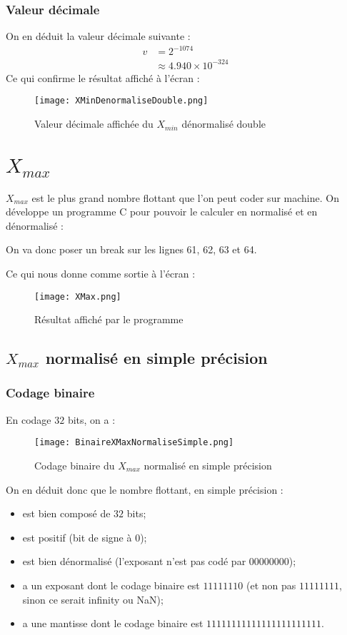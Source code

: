 \documentclass[a4paper, titlepage]{livret} %
\begin{document}
				\subsubsection{Valeur décimale}
					On en déduit la valeur décimale suivante :
					\[\begin{aligned}
						v & = 2^{-1074}\\
						  & \approx 4.940 \times 10^{-324}
					\end{aligned}\]
					Ce qui confirme le résultat affiché à l'écran :
					\begin{figure}[!h]
						\centering
  							\texttt{[image: XMinDenormaliseDouble.png]}
  							\caption{Valeur décimale affichée du $X_{min}$ dénormalisé double}
					\end{figure}

		\section{$X_{max}$}
			$X_{max}$ est le plus grand nombre flottant que l'on peut coder sur machine.
			On développe un programme C pour pouvoir le calculer en normalisé et en dénormalisé :
			
			On va donc poser un break sur les lignes 61, 62, 63 et 64.

			Ce qui nous donne comme sortie à l'écran :
			\begin{figure}[!h]
				\centering
  					\texttt{[image: XMax.png]}
  					\caption{Résultat affiché par le programme}
			\end{figure}

			\subsection{$X_{max}$ normalisé en simple précision}
				\subsubsection{Codage binaire}
					En codage $32$ bits, on a :
					\begin{figure}[!h]
						\centering
  							\texttt{[image: BinaireXMaxNormaliseSimple.png]}
  							\caption{Codage binaire du $X_{max}$ normalisé en simple précision}
					\end{figure}

					On en déduit donc que le nombre flottant, en simple précision :
					\begin{itemize}
						\item est bien composé de $32$ bits;
						\item est positif (bit de signe à 0);
						\item est bien dénormalisé (l'exposant n'est pas codé par $00000000$);
						\item a un exposant dont le codage binaire est $11111110$ (et non pas $11111111$, sinon ce serait infinity ou NaN);
						\item a une mantisse dont le codage binaire est $11111111 11111111 1111111$.
					\end{itemize}
					\newpage
\end{document}
